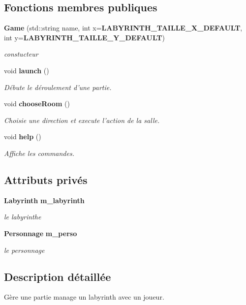 \subsection*{Fonctions membres publiques}
\begin{DoxyCompactItemize}
\item 
{\bf Game} (std\-::string name, int x={\bf L\-A\-B\-Y\-R\-I\-N\-T\-H\-\_\-\-T\-A\-I\-L\-L\-E\-\_\-\-X\-\_\-\-D\-E\-F\-A\-U\-L\-T}, int y={\bf L\-A\-B\-Y\-R\-I\-N\-T\-H\-\_\-\-T\-A\-I\-L\-L\-E\-\_\-\-Y\-\_\-\-D\-E\-F\-A\-U\-L\-T})
\begin{DoxyCompactList}\small\item\em constucteur \end{DoxyCompactList}\item 
void {\bf launch} ()
\begin{DoxyCompactList}\small\item\em Débute le déroulement d'une partie. \end{DoxyCompactList}\item 
void {\bf choose\-Room} ()
\begin{DoxyCompactList}\small\item\em Choisie une direction et execute l'action de la salle. \end{DoxyCompactList}\item 
void {\bf help} ()
\begin{DoxyCompactList}\small\item\em Affiche les commandes. \end{DoxyCompactList}\end{DoxyCompactItemize}
\subsection*{Attributs privés}
\begin{DoxyCompactItemize}
\item 
{\bf Labyrinth} {\bf m\-\_\-labyrinth}
\begin{DoxyCompactList}\small\item\em le labyrinthe \end{DoxyCompactList}\item 
{\bf Personnage} {\bf m\-\_\-perso}
\begin{DoxyCompactList}\small\item\em le personnage \end{DoxyCompactList}\end{DoxyCompactItemize}


\subsection{Description détaillée}
Gère une partie manage un labyrinth avec un joueur. 

